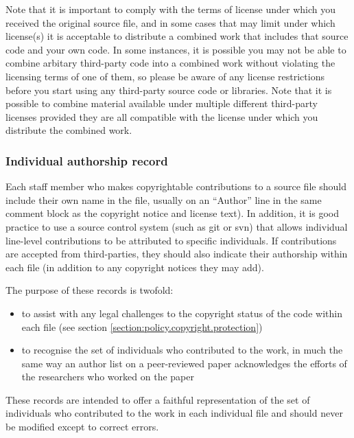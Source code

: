 \documentclass[10pt,a4paper]{article}
\begin{document}
\par Note that it is important to comply with the terms of license under 
which you received the original source file, and in some cases that may limit 
under which license(s) it is acceptable to distribute a combined work that 
includes that source code and your own code. In some instances, it is possible 
you may not be able to combine arbitary third-party code into a combined work 
without violating the licensing terms of one of them, so please be aware of any 
license restrictions before you start using any third-party source code or libraries. 
Note that it is possible to combine material available under multiple different 
third-party licenses provided they are all compatible \cite{define:compatible} with 
the license under which you distribute the combined work. 



\subsubsection{Individual authorship record}
\label{section:impnotes.records}
\par Each staff member who makes copyrightable contributions to a source file 
should include their own name in the file, usually on an ``Author'' line in the 
same comment block as the copyright notice and license text). In addition, it is 
good practice to use a source control system (such as git or svn) that allows 
individual line-level contributions to be attributed to specific individuals. If 
contributions are accepted from third-parties, they should also indicate their 
authorship within each file (in addition to any copyright notices they may add).

\par The purpose of these records is twofold: 
\begin{itemize}
\item to assist with any legal challenges to the copyright status of the code within 
each file (see section \ref{section:policy.copyright.protection})
\item to recognise the set of individuals who contributed to the work, in much the 
same way an author list on a peer-reviewed paper acknowledges the efforts of the 
researchers who worked on the paper
\end{itemize}

\par These records are intended to offer a faithful representation of the set of 
individuals who contributed to the work in each individual file and should never 
be modified except to correct errors. 
\end{document}
